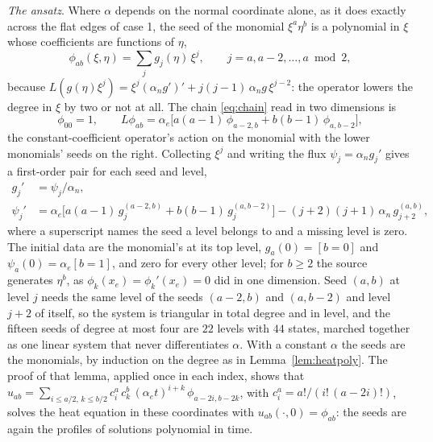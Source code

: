 \documentclass[11pt]{amsart}
\theoremstyle{definition}
\theoremstyle{remark}
\newcommand{\para}[1]{\par\smallskip\noindent\textit{#1}.\enspace}
\begin{document}
\para{The ansatz}
Where $\alpha$ depends on the normal coordinate alone, as it does exactly
across the flat edges of case 1, the seed of the monomial $\xi^a \eta^b$ is
a polynomial in $\xi$ whose coefficients are functions of $\eta$,
\begin{equation}
  \label{eq:ansatz}
  \phi_{ab}(\xi, \eta) = \sum_{j} g_j(\eta)\, \xi^j, \qquad
  j = a, a - 2, \ldots, a \bmod 2,
\end{equation}
because $L (g(\eta) \xi^j) = \xi^j (\alpha_n g')' + j (j - 1)\, \alpha_n g\,
\xi^{j-2}$: the operator lowers the degree in $\xi$ by two or not at all. The
chain \eqref{eq:chain} read in two dimensions is
\begin{equation}
  \label{eq:chain2d}
  \phi_{00} = 1, \qquad
  L \phi_{ab} = \alpha_e \bigl[ a (a - 1)\, \phi_{a-2, b} + b (b - 1)\,
  \phi_{a, b-2} \bigr],
\end{equation}
the constant-coefficient operator's action on the monomial with the lower
monomials' seeds on the right. Collecting $\xi^j$ and writing the flux
$\psi_j = \alpha_n g_j'$ gives a first-order pair for each seed and level,
\begin{equation}
  \label{eq:levels}
  \begin{aligned}
  g_j' &= \psi_j / \alpha_n, \\
  \psi_j' &= \alpha_e \bigl[ a (a - 1)\, g_j^{(a-2, b)} + b (b - 1)\,
  g_j^{(a, b-2)} \bigr] - (j + 2)(j + 1)\, \alpha_n\, g_{j+2}^{(a, b)},
  \end{aligned}
\end{equation}
where a superscript names the seed a level belongs to and a missing level is
zero. The initial data are the monomial's at its top level,
$g_a(0) = [b = 0]$ and $\psi_a(0) = \alpha_e [b = 1]$, and zero for every
other level; for $b \ge 2$ the source generates $\eta^b$, as
$\phi_k(x_e) = \phi_k'(x_e) = 0$ did in one dimension. Seed $(a, b)$ at level
$j$ needs the same level of the seeds $(a - 2, b)$ and $(a, b - 2)$ and level
$j + 2$ of itself, so the system is triangular in total degree and in level,
and the fifteen seeds of degree at most four are $22$ levels with $44$
states, marched together as one linear system that never differentiates
$\alpha$. With a constant $\alpha$ the seeds are the monomials, by induction
on the degree as in Lemma~\ref{lem:heatpoly}. The proof of that lemma,
applied once in each index, shows that
$u_{ab} = \sum_{i \le a/2,\, k \le b/2} c^{a}_{i}\, c^{b}_{k}\,
(\alpha_e t)^{i + k}\, \phi_{a - 2i, b - 2k}$, with $c^{a}_{i} = a! / (i!\, (a - 2i)!)$, solves the
heat equation in these coordinates with $u_{ab}(\cdot, 0) = \phi_{ab}$: the
seeds are again the profiles of solutions polynomial in time.
\end{document}
